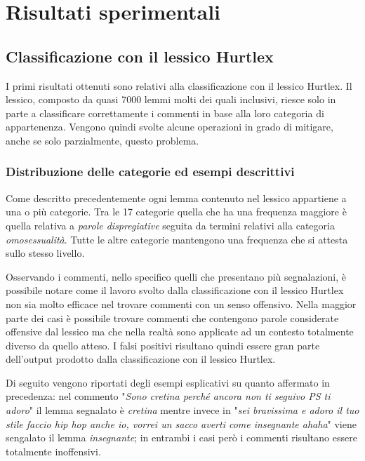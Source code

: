 
\chapter{Risultati sperimentali}
\hspace{0,5cm} 


\section{Classificazione con il lessico Hurtlex}
I primi risultati ottenuti sono relativi alla classificazione con il lessico Hurtlex. Il lessico, composto da quasi 7000 lemmi molti dei quali inclusivi, riesce solo in parte a classificare correttamente i commenti in base alla loro categoria di appartenenza. Vengono quindi svolte alcune operazioni in grado di mitigare, anche se solo parzialmente, questo problema.

\subsection{Distribuzione delle categorie ed esempi descrittivi}
    Come descritto precedentemente ogni lemma contenuto nel lessico appartiene a una o più categorie. Tra le 17 categorie quella che ha una frequenza maggiore è quella relativa a \textit{parole dispregiative} seguita da termini relativi alla categoria \textit{omosessualità}. Tutte le altre categorie mantengono una frequenza che si attesta sullo stesso livello.
    
    Osservando i commenti, nello specifico quelli che presentano più segnalazioni, è possibile notare come il lavoro svolto dalla classificazione con il lessico Hurtlex non sia molto efficace nel trovare commenti con un senso offensivo. Nella maggior parte dei casi è possibile trovare commenti che contengono parole considerate offensive dal lessico ma che nella realtà sono applicate ad un contesto totalmente diverso da quello atteso. I falsi positivi risultano quindi essere gran parte dell'output prodotto dalla classificazione con il lessico Hurtlex. 
    
    Di seguito vengono riportati degli esempi esplicativi su quanto affermato in precedenza:
    nel commento "\textit{Sono cretina perché ancora non ti seguivo PS ti adoro}" il lemma segnalato è \textit{cretina} mentre invece in "\textit{sei bravissima e adoro il tuo stile faccio hip hop anche io, vorrei un sacco averti come insegnante ahaha}" viene sengalato il lemma \textit{insegnante}; in entrambi i casi però i commenti risultano essere totalmente inoffensivi.


